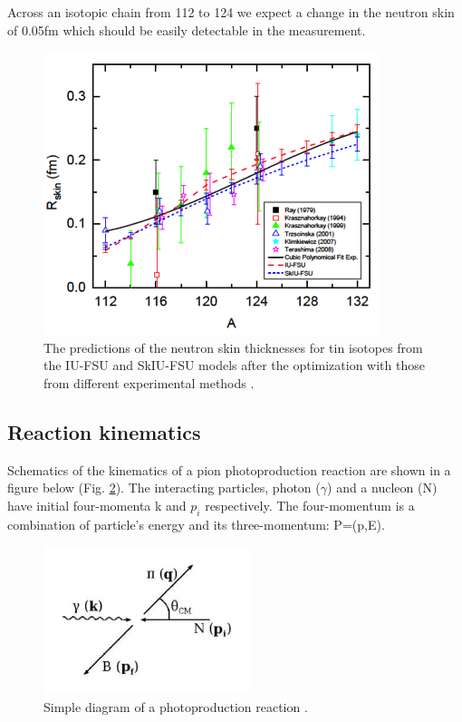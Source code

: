 \indent Across an isotopic chain from 112 to 124 we expect a change in the neutron skin of 0.05fm which should be easily detectable in the measurement.

\begin{figure}[H]
\begin{center}
\includegraphics[scale=0.6]{pictures/png/tiniso.png}
\caption{The predictions of the neutron skin thicknesses for tin isotopes from the IU-FSU and SkIU-FSU models after the optimization with those from different experimental methods \cite{fattoyev}.}
\label{tiniso}
\end{center}
\end{figure}

\subsection{Reaction kinematics}

\indent Schematics of the kinematics of a pion photoproduction reaction are shown in a figure below (Fig. \ref{photorea}). The interacting particles, photon ($\gamma$) and a nucleon (N) have initial four-momenta k and $p_{i}$ respectively. The four-momentum is a combination of particle's energy and its three-momentum: P=(p,E).

\begin{figure}[H]
\begin{center}
\includegraphics[scale=0.6]{pictures/png/photorea.png}
\caption{Simple diagram of a photoproduction reaction \cite{jo}.}
\label{photorea}
\end{center}
\end{figure}

